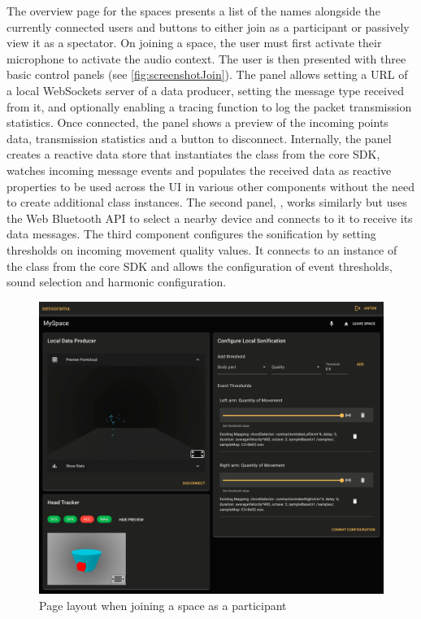 The overview page for the spaces presents a list of the names alongside the currently connected users and buttons to either join as a participant or passively view it as a spectator.
On joining a space, the user must first activate their microphone to activate the audio context.
The user is then presented with three basic control panels (see \autoref{fig:screenshotJoin}).
The  panel allows setting a URL of a local WebSockets server of a data producer, setting the message type received from it, and optionally enabling a tracing function to log the packet transmission statistics.
Once connected, the panel shows a preview of the incoming points data, transmission statistics and a button to disconnect.
Internally, the panel creates a reactive data store that instantiates the  class from the core \ac{SDK}, watches incoming message events and populates the received data as reactive properties to be used across the \ac{UI} in various other components without the need to create additional class instances.
The second panel, , works similarly but uses the Web Bluetooth \ac{API} to select a nearby device and connects to it to receive its data messages.
The third component configures the sonification by setting thresholds on incoming movement quality values.
It connects to an instance of the  class from the core \ac{SDK} and allows the configuration of event thresholds, sound selection and harmonic configuration.

\begin{figure}[!ht]
\centering
\includegraphics[width=\textwidth]{04_Artefakte/01_Abbildungen/screenshot-join}
\caption[Join space page screenshot]{Page layout when joining a space as a participant\protect}
\label{fig:screenshotJoin}
\end{figure}

